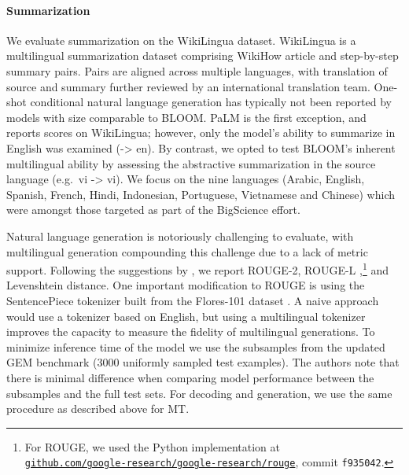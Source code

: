 \documentclass[twoside,11pt]{article}
\begin{document}
\paragraph{Summarization} We evaluate summarization on the WikiLingua \citep{ladhak-etal-2020-wikilingua} dataset. WikiLingua is a multilingual summarization dataset comprising WikiHow article and step-by-step summary pairs. Pairs are aligned across multiple languages, with translation of source and summary further reviewed by an international translation team. One-shot conditional natural language generation has typically not been reported by models with size comparable to BLOOM. PaLM \citep{chowdhery2022palm} is the first exception, and reports scores on WikiLingua; however, only the model's ability to summarize in English was examined (-> en). By contrast, we opted to test BLOOM's inherent multilingual ability by assessing the abstractive summarization in the source language (e.g.~vi -> vi). We focus on the nine %
languages (Arabic, English, Spanish, French, Hindi, Indonesian, Portuguese, Vietnamese and Chinese) which were amongst those targeted as part of the BigScience effort. %

Natural language generation is notoriously challenging to evaluate, with multilingual generation compounding this challenge due to a lack of metric support. Following the suggestions by \citet{gehrmann_cracked}, we report ROUGE-2, ROUGE-L \citep{lin-2004-rouge},\footnote{For ROUGE, we used the Python implementation at\\ \href{https://github.com/google-research/google-research/tree/master/rouge}{\texttt{github.com/google-research/google-research/rouge}}, commit \texttt{f935042}.} and Levenshtein distance. One important modification to ROUGE is using the SentencePiece tokenizer \citep{kudo-richardson-2018-sentencepiece} built from the Flores-101 dataset \citep{goyal-etal-2022-flores}.
A naive approach would use a tokenizer based on English, but using a multilingual tokenizer improves the capacity to measure the fidelity of multilingual generations. To minimize inference time of the model we use the subsamples from the updated GEM benchmark \citep{gemv2} (3000 uniformly sampled test examples).
The authors note that there is minimal difference when comparing model performance between the subsamples and the full test sets.
For decoding and generation, we use the same procedure as described above for MT.
\end{document}
